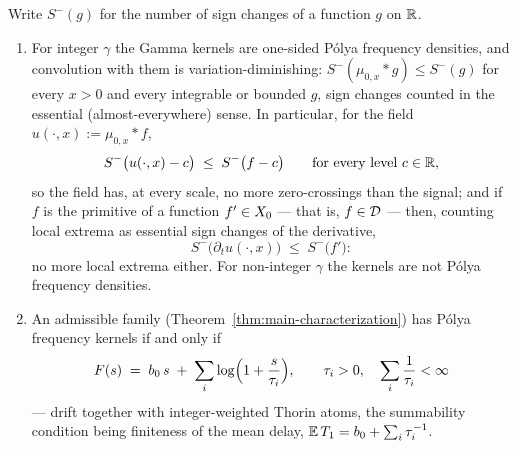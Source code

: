 \begin{proposition}\label{prop:gamma-regularity}
Write $S^-(g)$ for the number of sign changes of a function $g$ on $\mathbb{R}$.
\begin{enumerate}
\item For integer $\gamma$ the Gamma kernels are one-sided P\'olya frequency densities, and
convolution with them is variation-diminishing: $S^-(\mu_{0,x} * g) \le S^-(g)$ for every
$x > 0$ and every integrable or bounded $g$, sign changes counted in the essential
(almost-everywhere) sense. In particular, for the field $u(\cdot, x) := \mu_{0,x} * f$,
\[
  S^-\bigl(u(\cdot, x) - c\bigr) \;\le\; S^-\bigl(f - c\bigr)
  \qquad \text{for every level } c \in \mathbb{R},
\]
so the field has, at every scale, no more zero-crossings than the signal; and if $f$ is
the primitive of a function $f' \in X_0$ --- that is, $f \in \mathcal{D}$ --- then, counting
local extrema as essential sign changes of the derivative,
\[
  S^-\bigl(\partial_t u(\cdot, x)\bigr) \;\le\; S^-\bigl(f'\bigr):
\]
no more local extrema either. For non-integer $\gamma$ the kernels are not P\'olya frequency
densities.
\item An admissible family (Theorem~\ref{thm:main-characterization}) has P\'olya frequency
kernels if and only if
\[
  F(s) \;=\; b_0\,s \;+\; \sum_{i} \log\Bigl(1 + \frac{s}{\tau_i}\Bigr),
  \qquad \tau_i > 0, \quad \sum_i \frac{1}{\tau_i} < \infty
\]
--- drift together with integer-weighted Thorin atoms, the summability condition being
finiteness of the mean delay, $\mathbb{E}\,T_1 = b_0 + \sum_i \tau_i^{-1}$.
\end{enumerate}
\end{proposition}

